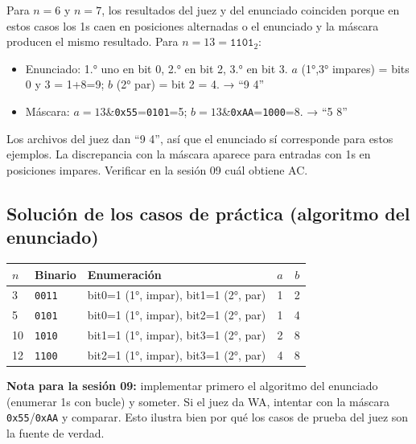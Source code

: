 \documentclass[12pt, oneside]{article}
\begin{document}
\begin{notaprofesor}
  Para $n=6$ y $n=7$, los resultados del juez y del enunciado coinciden porque
  en estos casos los 1s caen en posiciones alternadas o el enunciado y la máscara
  producen el mismo resultado.  Para $n=13=\texttt{1101}_2$:
  \begin{itemize}
    \item Enunciado: 1.° uno en bit 0, 2.° en bit 2, 3.° en bit 3.
          $a$ (1°,3° impares) = bits 0 y 3 = 1+8=9; $b$ (2° par) = bit 2 = 4. → ``9 4''
    \item Máscara: $a=13$\&\texttt{0x55}=\texttt{0101}=5; $b=13$\&\texttt{0xAA}=\texttt{1000}=8. → ``5 8''
  \end{itemize}
  Los archivos del juez dan ``9 4'', así que el enunciado sí corresponde para estos ejemplos.
  La discrepancia con la máscara aparece para entradas con 1s en posiciones impares.
  Verificar en la sesión 09 cuál obtiene AC.
\end{notaprofesor}

\subsection{Solución de los casos de práctica (algoritmo del enunciado)}

\begin{center}
\begin{tabular}{p{0.6cm}p{1.5cm}p{5cm}cc}
  \toprule
  $n$ & Binario & Enumeración & $a$ & $b$ \\
  \midrule
   3 & \texttt{0011}
     & bit0=1 (1°, impar), bit1=1 (2°, par)
     & 1 & 2 \\[4pt]
   5 & \texttt{0101}
     & bit0=1 (1°, impar), bit2=1 (2°, par)
     & 1 & 4 \\[4pt]
  10 & \texttt{1010}
     & bit1=1 (1°, impar), bit3=1 (2°, par)
     & 2 & 8 \\[4pt]
  12 & \texttt{1100}
     & bit2=1 (1°, impar), bit3=1 (2°, par)
     & 4 & 8 \\[4pt]
  \bottomrule
\end{tabular}
\end{center}

\begin{notaprofesor}
  \textbf{Nota para la sesión 09:} implementar primero el algoritmo del
  enunciado (enumerar 1s con bucle) y someter.  Si el juez da WA, intentar
  con la máscara \texttt{0x55}/\texttt{0xAA} y comparar.  Esto ilustra bien
  por qué los casos de prueba del juez son la fuente de verdad.
\end{notaprofesor}
\end{document}
